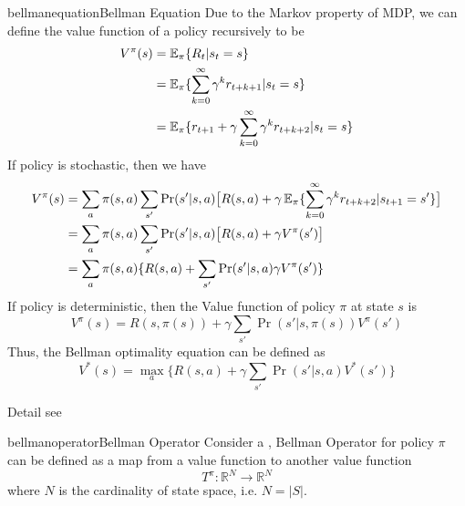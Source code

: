 \documentclass[9pt]{article}
\begin{document}
\begin{topic}{bellmanequation}{Bellman Equation}
Due to the Markov property of MDP, we can define the value function of a policy recursively to be 
\begin{displaymath}
  \begin{split}
    V^{\pi}(s) & = \operatorname{\mathbb{E}}_{\pi}\{R_t|s_t=s\}\\
    & = \operatorname{\mathbb{E}}_{\pi}\{\sum_{k=0}^{\infty}{\gamma^{k}r_{t+k+1}}|s_t = s\}\\
    & = \operatorname{\mathbb{E}}_{\pi}\{r_{t+1}+\gamma \sum_{k=0}^{\infty}{\gamma^{k}r_{t+k+2}}|s_t = s\}\\
  \end{split}
\end{displaymath}
If policy is stochastic, then we have
\begin{displaymath}
  \begin{split}
    V^{\pi}(s) & = \sum_{a}\pi(s,a)\sum_{s'}\Pr(s'|s,a)\big[R(s,a)+\gamma \operatorname{\mathbb{E}}_{\pi}\{\sum_{k=0}^{\infty}\gamma^{k}r_{t+k+2}|s_{t+1}=s'\}\big]\\
    & = \sum_{a}\pi(s,a)\sum_{s'}\Pr(s'|s,a)\big[R(s,a)+\gamma V^{\pi}(s')\big]\\
    & = \sum_{a}\pi(s,a)\{R(s,a)+\sum_{s'}\Pr(s'|s,a)\gamma V^{\pi}(s')\}
  \end{split}
\end{displaymath}
If policy is deterministic, then the Value function of policy $\pi$ at state $s$ is
\begin{displaymath}
  V^{\pi}(s) = R(s,\pi(s))+\gamma \sum_{s'}\Pr(s'|s,\pi(s))V^{\pi}(s')
\end{displaymath}
Thus, the Bellman optimality equation can be defined as
\begin{displaymath}
  V^{*}(s) = \max_a \{R(s,a)+\gamma \sum_{s'}\Pr(s'|s,a)V^{*}(s')\}
\end{displaymath}

Detail see \citep{barto1998reinforcement}
\end{topic}

\begin{topic}{bellmanoperator}{Bellman Operator} Consider a , Bellman Operator for policy $\pi$ can be defined as a map from a value function to another value function
\begin{displaymath}
  T^\pi:\mathbb{R}^N \rightarrow \mathbb{R}^N
\end{displaymath}
where $N$ is the cardinality of state space, i.e. $N = |S|$.

\Working
\end{topic}
\end{document}
